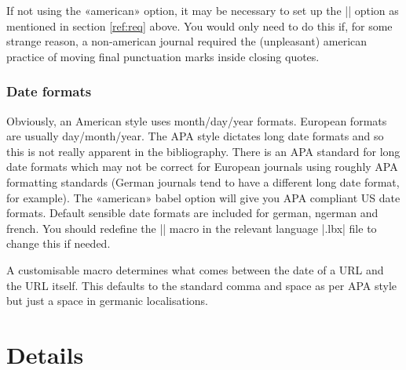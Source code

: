 \documentclass{ltxdockit}
\begin{document}
If not using the  «american» option, it may be necessary to set up
the |\DeclareQuotePunctuation| option as mentioned in section \ref{ref:req}
above. You would only need to do this if, for some strange reason, a
non-american journal required the (unpleasant) american practice of moving
final punctuation marks inside closing quotes.

\subsubsection{Date formats}

Obviously, an American style uses month/day/year formats. European formats
are usually day/month/year. The APA style dictates long date formats and so
this is not really apparent in the bibliography. There is an APA standard
for long date formats which may not be correct for European journals using
roughly APA formatting standards (German journals tend to have a different
long date format, for example). The «american» babel option will give you
APA compliant US date formats. Default sensible date formats are included
for german, ngerman and french. You should redefine the |\mkbibdatelong|
macro in the relevant language |.lbx| file to change this if needed.

A customisable macro  determines what comes between the
date of a URL and the URL itself. This defaults to the standard comma and
space as per APA style but just a space in germanic localisations.

\section{Details}
\end{document}

